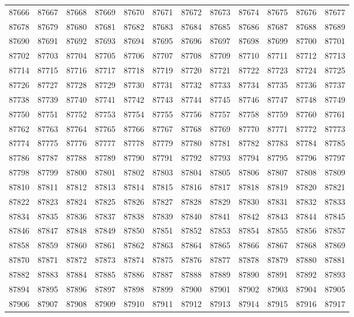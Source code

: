 \begin{center}
\begin{longtable}{llllllllllll}
87666 &87667 &87668 &87669 &87670 &87671 &87672 &87673 &87674 &87675 &87676 &87677 \\
87678 &87679 &87680 &87681 &87682 &87683 &87684 &87685 &87686 &87687 &87688 &87689 \\
87690 &87691 &87692 &87693 &87694 &87695 &87696 &87697 &87698 &87699 &87700 &87701 \\
87702 &87703 &87704 &87705 &87706 &87707 &87708 &87709 &87710 &87711 &87712 &87713 \\
87714 &87715 &87716 &87717 &87718 &87719 &87720 &87721 &87722 &87723 &87724 &87725 \\
87726 &87727 &87728 &87729 &87730 &87731 &87732 &87733 &87734 &87735 &87736 &87737 \\
87738 &87739 &87740 &87741 &87742 &87743 &87744 &87745 &87746 &87747 &87748 &87749 \\
87750 &87751 &87752 &87753 &87754 &87755 &87756 &87757 &87758 &87759 &87760 &87761 \\
87762 &87763 &87764 &87765 &87766 &87767 &87768 &87769 &87770 &87771 &87772 &87773 \\
87774 &87775 &87776 &87777 &87778 &87779 &87780 &87781 &87782 &87783 &87784 &87785 \\
87786 &87787 &87788 &87789 &87790 &87791 &87792 &87793 &87794 &87795 &87796 &87797 \\
87798 &87799 &87800 &87801 &87802 &87803 &87804 &87805 &87806 &87807 &87808 &87809 \\
87810 &87811 &87812 &87813 &87814 &87815 &87816 &87817 &87818 &87819 &87820 &87821 \\
87822 &87823 &87824 &87825 &87826 &87827 &87828 &87829 &87830 &87831 &87832 &87833 \\
87834 &87835 &87836 &87837 &87838 &87839 &87840 &87841 &87842 &87843 &87844 &87845 \\
87846 &87847 &87848 &87849 &87850 &87851 &87852 &87853 &87854 &87855 &87856 &87857 \\
87858 &87859 &87860 &87861 &87862 &87863 &87864 &87865 &87866 &87867 &87868 &87869 \\
87870 &87871 &87872 &87873 &87874 &87875 &87876 &87877 &87878 &87879 &87880 &87881 \\
87882 &87883 &87884 &87885 &87886 &87887 &87888 &87889 &87890 &87891 &87892 &87893 \\
87894 &87895 &87896 &87897 &87898 &87899 &87900 &87901 &87902 &87903 &87904 &87905 \\
87906 &87907 &87908 &87909 &87910 &87911 &87912 &87913 &87914 &87915 &87916 &87917 \\

\end{longtable}
\end{center}
